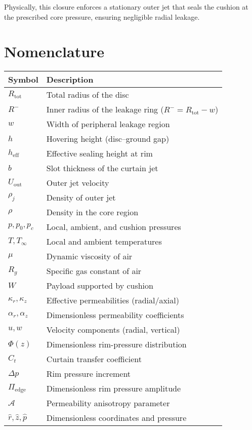 \documentclass[11pt,a4paper]{article}
\begin{document}
Physically, this closure enforces a stationary outer jet that seals the cushion
at the prescribed core pressure, ensuring negligible radial leakage.
\section{Nomenclature}
\label{sec:nomenclature}

\begin{tabular}{@{}ll@{}}
\toprule
Symbol & Description \\ \midrule
$R_{\mathrm{tot}}$ & Total radius of the disc \\
$R^{-}$ & Inner radius of the leakage ring ($R^{-}=R_{\mathrm{tot}}-w$) \\
$w$ & Width of peripheral leakage region \\
$h$ & Hovering height (disc--ground gap) \\
$h_{\mathrm{eff}}$ & Effective sealing height at rim \\
$b$ & Slot thickness of the curtain jet \\
$U_{\mathrm{out}}$ & Outer jet velocity \\
$\rho_j$ & Density of outer jet \\
$\rho$ & Density in the core region \\
$p,p_0,p_c$ & Local, ambient, and cushion pressures \\
$T,T_\infty$ & Local and ambient temperatures \\
$\mu$ & Dynamic viscosity of air \\
$R_g$ & Specific gas constant of air \\
$W$ & Payload supported by cushion \\
$\kappa_r,\kappa_z$ & Effective permeabilities (radial/axial) \\
$\alpha_r,\alpha_z$ & Dimensionless permeability coefficients \\
$u,w$ & Velocity components (radial, vertical) \\
$\Phi(z)$ & Dimensionless rim-pressure distribution \\
$C_t$ & Curtain transfer coefficient \\
$\Delta p$ & Rim pressure increment \\
$\Pi_{\mathrm{edge}}$ & Dimensionless rim pressure amplitude \\
$\mathcal{A}$ & Permeability anisotropy parameter \\
$\hat r,\hat z,\hat p$ & Dimensionless coordinates and pressure \\

\end{tabular}
\end{document}
